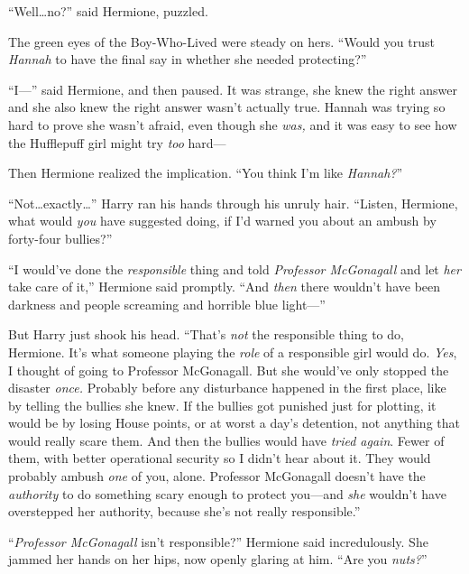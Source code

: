 “Well…no?” said Hermione, puzzled.

The green eyes of the Boy-Who-Lived were steady on hers. “Would you trust \emph{Hannah} to have the final say in whether she needed protecting?”

“I—” said Hermione, and then paused. It was strange, she knew the right answer and she also knew the right answer wasn’t actually true. Hannah was trying so hard to prove she wasn’t afraid, even though she \emph{was,} and it was easy to see how the Hufflepuff girl might try \emph{too} hard—

Then Hermione realized the implication. “You think I’m like \emph{Hannah?}”

“Not…exactly…” Harry ran his hands through his unruly hair. “Listen, Hermione, what would \emph{you} have suggested doing, if I’d warned you about an ambush by forty-four bullies?”

“I would’ve done the \emph{responsible} thing and told \emph{Professor McGonagall} and let \emph{her} take care of it,” Hermione said promptly. “And \emph{then} there wouldn’t have been darkness and people screaming and horrible blue light—”

But Harry just shook his head. “That’s \emph{not} the responsible thing to do, Hermione. It’s what someone playing the \emph{role} of a responsible girl would do. \emph{Yes}, I thought of going to Professor McGonagall. But she would’ve only stopped the disaster \emph{once.} Probably before any disturbance happened in the first place, like by telling the bullies she knew. If the bullies got punished just for plotting, it would be by losing House points, or at worst a day’s detention, not anything that would really scare them. And then the bullies would have \emph{tried again}. Fewer of them, with better operational security so I didn’t hear about it. They would probably ambush \emph{one} of you, alone. Professor McGonagall doesn’t have the \emph{authority} to do something scary enough to protect you—and \emph{she} wouldn’t have overstepped her authority, because she’s not really responsible.”

“\emph{Professor McGonagall} isn’t responsible?” Hermione said incredulously. She jammed her hands on her hips, now openly glaring at him. “Are you \emph{nuts?}”

